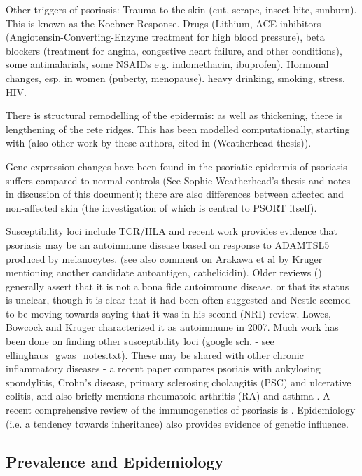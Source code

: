 \documentclass[a4paper,10pt]{report}
\begin{document}
Other triggers of psoriasis:
Trauma to the skin (cut, scrape, insect bite, sunburn). This is known as the Koebner Response.
Drugs (Lithium, ACE inhibitors (Angiotensin-Converting-Enzyme treatment for high blood pressure), beta blockers (treatment for angina, congestive heart failure, and other conditions), some antimalarials, some NSAIDs e.g. indomethacin, ibuprofen).
Hormonal changes, esp. in women (puberty, menopause).
heavy drinking, smoking, stress. 
HIV. 


There is structural remodelling of the epidermis: as well as thickening,
there is lengthening of the rete ridges. This has 
been modelled computationally, starting with \cite {iizuka2004psoriatic} (also other work by these authors, cited in (Weatherhead thesis)).

Gene expression changes have been found in the psoriatic epidermis of psoriasis
suffers compared to normal controls (See Sophie Weatherhead's thesis and 
notes in discussion of this document); there are also differences between 
affected and non-affected skin (the investigation of which is central to PSORT
itself). 

Susceptibility loci include TCR/HLA and recent work \cite{arakawa2015melanocyte} provides evidence that psoriasis may be an autoimmune disease based on response to ADAMTSL5 produced by melanocytes. (see also comment on Arakawa et al by Kruger mentioning another candidate autoantigen, cathelicidin). Older reviews (\cite{griffiths2007pathogenesis, nestle2009immune, nestle2009mechanisms}) generally assert that it is not a bona fide autoimmune disease, or that its status is
unclear, though it is clear that it had been often suggested and Nestle seemed to be moving towards saying that it was in his second (NRI) review. Lowes, Bowcock and Kruger \cite{lowes2007pathogenesis} characterized it as autoimmune in 2007.
Much work has been done on finding other susceptibility loci
(google sch. - see ellinghaus\_gwas\_notes.txt). These may be shared with 
other chronic inflammatory diseases - a recent paper compares psoriais with ankylosing spondylitis,
Crohn’s disease, primary sclerosing cholangitis (PSC) and
ulcerative colitis, and also briefly mentions rheumatoid arthritis (RA) and asthma \cite{ellinghaus2016analysis}.
A recent comprehensive review of the immunogenetics of psoriasis is \cite{harden2015immunogenetics}. Epidemiology (i.e. a tendency towards inheritance) also provides evidence of genetic influence.

\subsection{Prevalence and Epidemiology}
\end{document}
